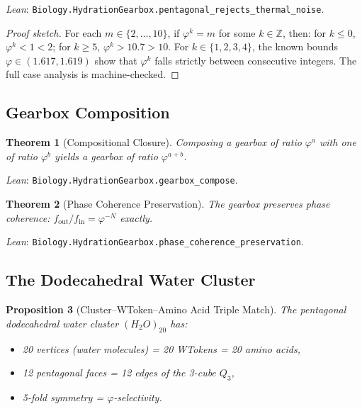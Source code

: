 \documentclass[12pt,a4paper]{article}
\newtheorem{theorem}{Theorem}[section]
\newtheorem{proposition}[theorem]{Proposition}
\theoremstyle{definition}
\theoremstyle{remark}
\begin{document}
\noindent
\textit{Lean}: \texttt{Biology.HydrationGearbox.pentagonal\_rejects\_thermal\_noise}.

\begin{proof}[Proof sketch]
For each $m \in \{2, \ldots, 10\}$, if $\varphi^k = m$ for some
$k \in \mathbb{Z}$, then: for $k \leq 0$, $\varphi^k < 1 < 2$; for
$k \geq 5$, $\varphi^k > 10.7 > 10$.  For $k \in \{1,2,3,4\}$, the
known bounds $\varphi \in (1.617, 1.619)$ show that $\varphi^k$ falls
strictly between consecutive integers.  The full case analysis is
machine-checked.
\end{proof}

\subsection{Gearbox Composition}

\begin{theorem}[Compositional Closure]
Composing a gearbox of ratio $\varphi^a$ with one of ratio $\varphi^b$
yields a gearbox of ratio $\varphi^{a+b}$.
\end{theorem}

\noindent
\textit{Lean}: \texttt{Biology.HydrationGearbox.gearbox\_compose}.

\begin{theorem}[Phase Coherence Preservation]
The gearbox preserves phase coherence:
$f_{\mathrm{out}} / f_{\mathrm{in}} = \varphi^{-N}$ exactly.
\end{theorem}

\noindent
\textit{Lean}: \texttt{Biology.HydrationGearbox.phase\_coherence\_preservation}.

\subsection{The Dodecahedral Water Cluster}

\begin{proposition}[Cluster--WToken--Amino Acid Triple Match]
The pentagonal dodecahedral water cluster $(H_2O)_{20}$ has:
\begin{itemize}[nosep]
  \item 20 vertices (water molecules) = 20 WTokens = 20 amino acids,
  \item 12 pentagonal faces = 12 edges of the 3-cube $Q_3$,
  \item 5-fold symmetry = $\varphi$-selectivity.
\end{itemize}
\end{proposition}
\end{document}
